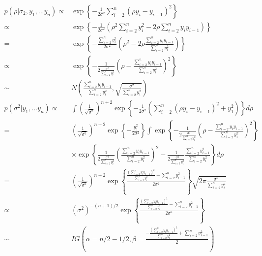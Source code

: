 \documentclass[11pt]{article}
\begin{document}
\begin{enumerate}
\begin{enumerate}
\begin{align*}
p(\rho|\sigma_2, y_1,...y_n) \propto & \exp\left\{-\frac{1}{2\sigma^2}\sum_{i=2}^{n}(\rho y_{i}-y_{i-1})^2 \right\}\\
\propto & \exp\left\{-\frac{1}{2\sigma^2} (\rho^2 \sum_{i=2}^{n} y_i^2- 2\rho\sum_{i=2}^{n} y_{i} y_{i-1}) \right\}\\
= & \exp\left\{-\frac{\sum_{i=2}^{n} y_i^2}{2\sigma^2} (\rho^2 - 2\rho\frac{\sum_{i=2}^{n} y_{i} y_{i-1}}{\sum_{i=2}^{n} y_i^2}) \right\}\\
\propto & \exp\left\{-\frac{1}{2\frac{\sigma^2}{\sum_{i=2}^{n} y_i^2}} (\rho  - \frac{\sum_{i=2}^{n} y_{i} y_{i-1}}{\sum_{i=2}^{n} y_i^2})^2 \right\}\\
\sim & N(\frac{\sum_{i=2}^{n} y_{i} y_{i-1}}{\sum_{i=2}^{n} y_i^2}, \sqrt{\frac{\sigma^2}{\sum_{i=2}^{n} y_i^2}})\\
p(\sigma^2| y_1,...y_n) \propto & \int (\frac{1}{\sqrt{\sigma^2}})^{n+2}\exp\left\{-\frac{1}{2\sigma^2}(\sum_{i=2}^{n}(\rho y_{i}-y_{i-1})^2 + y_1^2) \right\} d\rho \\
=& (\frac{1}{\sqrt{\sigma^2}})^{n+2}\exp\left\{-\frac{y_1^2}{2\sigma^2}\right\} \int \exp\left\{-\frac{1}{2\frac{\sigma^2}{\sum_{i=2}^{n} y_i^2}} (\rho  - \frac{\sum_{i=2}^{n} y_{i} y_{i-1}}{\sum_{i=2}^{n} y_i^2})^2 \right\}\\
& \times \exp\left\{\frac{1}{2\frac{\sigma^2}{\sum_{i=2}^{n} y_i^2}}(\frac{\sum_{i=2}^{n} y_{i} y_{i-1}}{\sum_{i=2}^{n} y_i^2})^2 - \frac{1}{2\frac{\sigma^2}{\sum_{i=2}^{n} y_i^2}}\frac{\sum_{i=2}^{n} y_{i-1}^2}{\sum_{i=2}^{n} y_i^2} \right\} d\rho \\
=& (\frac{1}{\sqrt{\sigma^2}})^{n+2}\exp\left\{\frac{\frac{(\sum_{i=2}^{n} y_{i} y_{i-1})^2}{\sum_{i=2}^{n} y_i^2} - \sum_{i=2}^{n} y_{i-1}^2}{2 \sigma^2}\right\} \sqrt{2\pi\frac{\sigma^2}{\sum_{i=2}^{n} y_i^2}}\\
\propto & (\sigma^2)^{-(n+1)/2}\exp\left\{\frac{\frac{(\sum_{i=2}^{n} y_{i} y_{i-1})^2}{\sum_{i=2}^{n} y_i^2} - \sum_{i=2}^{n} y_{i-1}^2}{2 \sigma^2}\right\} \\
\sim & IG(\alpha = n/2 - 1/2, \beta = \frac{-\frac{(\sum_{i=2}^{n} y_{i} y_{i-1})^2}{\sum_{i=2}^{n} y_i^2} + \sum_{i=2}^{n} y_{i-1}^2}{2}) 
\end{align*}
\end{enumerate}
\end{enumerate}
\end{document}
